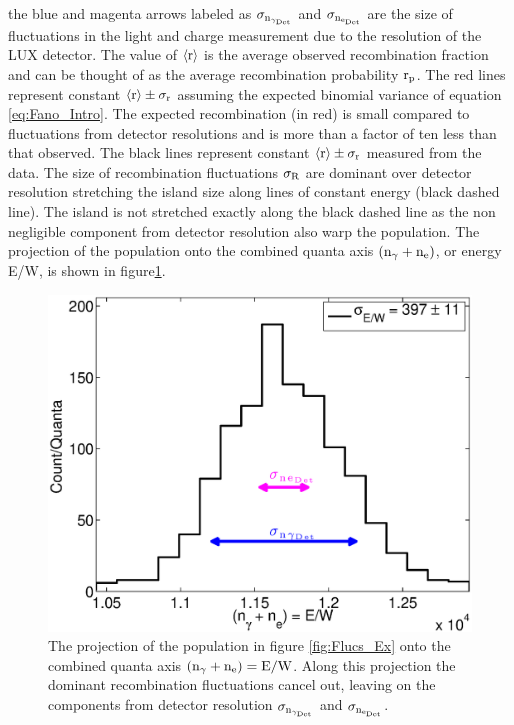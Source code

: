 \noindent the blue and magenta arrows labeled as $\rm \sigma_{n_{\gamma_{Det}}}$ and $\rm \sigma_{n_{e_{Det}}}$ are the size of fluctuations in the light and charge measurement due to the resolution of the LUX detector. The value of $\rm \left<r\right>$ is the average observed recombination fraction and can be thought of as the average recombination probability $\rm r_p$. The red lines represent constant $\rm \left<r\right> \pm \sigma_r $ assuming the expected binomial variance of equation \ref{eq:Fano_Intro}. The expected recombination (in red) is small compared to fluctuations from detector resolutions and is more than a factor of ten less than that observed. The black lines represent constant $\rm \left<r\right> \pm \sigma_r $ measured from the data. The size of recombination fluctuations $\rm \sigma_R$ are dominant over detector resolution stretching the island size along lines of constant energy (black dashed line). The island is not stretched exactly along the black dashed line as the non negligible component from detector resolution also warp the population. The projection of the population onto the combined quanta axis $\rm (n_\gamma + n_e)$, or energy E/W, is shown in figure\ref{fig:Flucs_Ex_E}.

\renewcommand{\baselinestretch}{1}
\small\normalsize
\begin{figure}[h!]\centering
\includegraphics[width=120mm]{Chapter_Flucs/Figures/Ex_Plots/E_fig.eps}
\caption{The projection of the population in figure \ref{fig:Flucs_Ex} onto the combined quanta axis $\rm (n_\gamma + n_e) = E/W$. Along this projection the dominant recombination fluctuations cancel out, leaving on the components from detector resolution $\rm \sigma_{n_{\gamma_{Det}}}$ and $\rm \sigma_{n_{e_{Det}}}$. }
\label{fig:Flucs_Ex_E}
\end{figure}
\renewcommand{\baselinestretch}{2}
\small\normalsize

